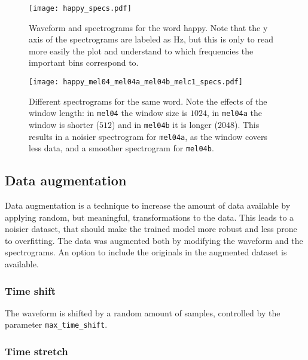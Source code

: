 \begin{figure}[t!]
    \centering
    \texttt{[image: happy\_specs.pdf]}
    \caption{ Waveform and spectrograms for the word happy. Note that the y
        axis of the spectrograms are labeled as Hz, but this is only to read
        more easily the plot and understand to which frequencies the important
        bins correspond to.
    }%
    \label{fig:happy_specs}
\end{figure}

\begin{figure}[t!]
    \centering
    \texttt{[image: happy\_mel04\_mel04a\_mel04b\_melc1\_specs.pdf]}
    \caption{Different spectrograms for the same word. Note the effects of the
        window length: in \texttt{mel04} the window size is $1024$, in
        \texttt{mel04a} the window is shorter ($512$) and in \texttt{mel04b} it
        is longer ($2048$). This results in a noisier spectrogram for
        \texttt{mel04a}, as the window covers less data, and a smoother
        spectrogram for \texttt{mel04b}.
    }%
    \label{fig:happy_mel01_mel04_mel06_melc1_specs}
\end{figure}


\subsection{Data augmentation}
\label{sec:data_augmentation}

Data augmentation is a technique to increase the amount of data available by
applying random, but meaningful, transformations to the data. This leads to a
noisier dataset, that should make the trained model more robust and less prone
to overfitting. The data was augmented both by modifying the waveform and the
spectrograms. An option to include the originals in the augmented dataset is
available.

\subsubsection{Time shift}

The waveform is shifted by a random amount of samples, controlled by the
parameter \texttt{max\_time\_shift}.

\subsubsection{Time stretch}

